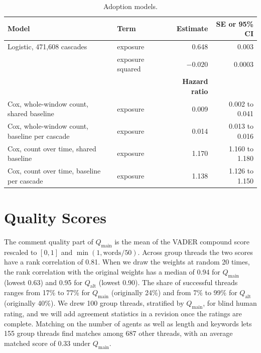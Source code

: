 \documentclass[11pt]{article}
\newcommand{\qmain}{Q_{\text{main}}}
\newcommand{\qalt}{Q_{\text{alt}}}
\begin{document}
\begin{table}[H]
\centering
\caption{Adoption models.}
\label{tab:adoption}
\small
\begin{tabular}{@{}llrr@{}}
\toprule
\textbf{Model} & \textbf{Term} & \textbf{Estimate} & \textbf{SE or 95\% CI} \\
\midrule
Logistic, 471,608 cascades & exposure & 0.648 & 0.003 \\
 & exposure squared & $-0.020$ & 0.0003 \\
\midrule
 & & \textbf{Hazard ratio} & \\
Cox, whole-window count, shared baseline & exposure & 0.009 & 0.002 to 0.041 \\
Cox, whole-window count, baseline per cascade & exposure & 0.014 & 0.013 to 0.016 \\
Cox, count over time, shared baseline & exposure & 1.170 & 1.160 to 1.180 \\
Cox, count over time, baseline per cascade & exposure & 1.138 & 1.126 to 1.150 \\
\bottomrule
\end{tabular}
\end{table}

\section{Quality Scores}
\label{app:quality}

The comment quality part of $\qmain$ is the mean of the VADER compound score rescaled to $[0,1]$ and $\min(1, \text{words}/50)$. Across group threads the two scores have a rank correlation of 0.81. When we draw the weights at random 20 times, the rank correlation with the original weights has a median of 0.94 for $\qmain$ (lowest 0.63) and 0.95 for $\qalt$ (lowest 0.90). The share of successful threads ranges from 17\% to 77\% for $\qmain$ (originally 24\%) and from 7\% to 99\% for $\qalt$ (originally 40\%). We drew 100 group threads, stratified by $\qmain$, for blind human rating, and we will add agreement statistics in a revision once the ratings are complete. Matching on the number of agents as well as length and keywords lets 155 group threads find matches among 687 other threads, with an average matched score of 0.33 under $\qmain$.
\end{document}

